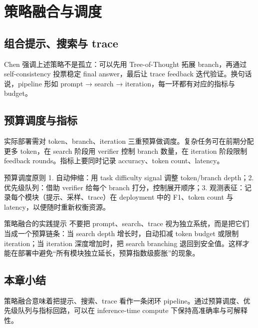 \section{策略融合与调度}

\subsection{组合提示、搜索与 trace}
Chen 强调上述策略不是孤立：可以先用 Tree-of-Thought 拓展 branch，再通过 self-consistency 投票稳定 final answer，最后让 trace feedback 迭代验证。换句话说，pipeline 形如 prompt → search → iteration，每一环都有对应的指标与 budget。

\subsection{预算调度与指标}
实际部署需对 token、branch、iteration 三重预算做调度。复杂任务可在前期分配更多 token，在 search 阶段用 verifier 控制 branch 数量，在 iteration 阶段限制 feedback rounds。指标上要同时记录 accuracy、token count、latency。

\begin{knowledgebox}{预算调度原则}
1. 自动伸缩：用 task difficulty signal 调整 token/branch depth；2. 优先级队列：借助 verifier 给每个 branch 打分，控制展开顺序；3. 观测表征：记录每个模块（提示、采样、trace）在 deployment 中的 F1、token count 与 latency，以便随时重新权衡资源。
\end{knowledgebox}

\begin{importantbox}{策略融合的实践提示}
不要把 prompt、search、trace 视为独立系统，而是把它们当成一个预算链条：当 search depth 增长时，自动扣减 token budget 或限制 iteration；当 iteration 深度增加时，把 search branching 退回到安全值。这样才能在部署中避免“所有模块独立延长，预算指数级膨胀”的现象。
\end{importantbox}

\subsection{本章小结}
策略融合意味着把提示、搜索、trace 看作一条闭环 pipeline。通过预算调度、优先级队列与指标回路，可以在 inference-time compute 下保持高准确率与可解释性。


